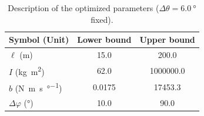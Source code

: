 \begin{table}[thpb]
\centering
\caption{Description of the optimized parameters ($\Delta\theta = \SI{6.0}{\degree}$ fixed).}
\begin{tabular}{l S S}
    \toprule
    {Symbol (Unit)} & {Lower bound} & {Upper bound} \\
    \midrule
    $\ell$ (\si{\meter}) & 15.0 & 200.0 \\ 
    $I$ (\si{\kilogram\meter\squared}) & 62.0 & 1000000.0 \\ 
    $b$ (\si{\newton\meter\second\per\degree}) & 0.0175 & 17453.3 \\ 
    $\Delta\varphi$ (\si{\degree}) & 10.0 & 90.0 \\ 
    \bottomrule
\end{tabular}
\label{tab:opt_descr}
\end{table}
